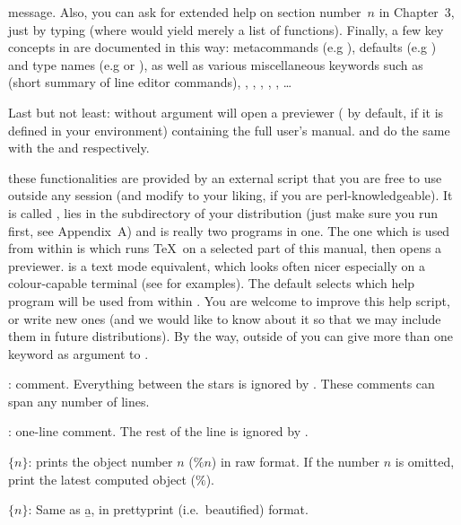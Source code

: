 
\noindent message. Also, you can ask for extended help on section
number~$n$ in Chapter~3, just by typing  (where  would
yield merely a list of functions). Finally, a few key concepts in  are
documented in this way: metacommands (e.g ), defaults (e.g
) and type names (e.g  or ), as well as
various miscellaneous keywords such as  (short summary of line
editor commands), , , ,
, , \dots

Last but not least:  without argument will open a 
previewer ( by default,  if it is defined in your
environment) containing the full user's manual.  and
 do the same with the  and 
respectively.

 these functionalities are provided by an
external  script that you are free to use outside any  session
(and modify to your liking, if you are perl-knowledgeable). It is called
, lies in the  subdirectory of your distribution
(just make sure you run  first, see Appendix~A) and is
really two programs in one. The one which is used from within  is
 which runs \TeX\ on a selected part of this manual, then opens
a previewer.  is a text mode equivalent, which looks
often nicer especially on a colour-capable terminal (see
 for examples). The default  selects which
help program will be used from within . You are welcome to improve this
help script, or write new ones (and we would like to know about it
so that we may include them in future distributions). By the way, outside
of  you can give more than one keyword as argument to .

: comment. Everything between the stars is ignored by
. These comments can span any number of lines.

\subseckbd{\bs\bs}: one-line comment. The rest of the line
is ignored by .

 $\{n\}$: prints the object number $n$ ($\%n$)
in raw format. If the number $n$ is omitted, print the latest computed object
($\%$). \label{se:history}

 $\{n\}$: Same as \b{a}, in prettyprint (i.e.~beautified)
format.

